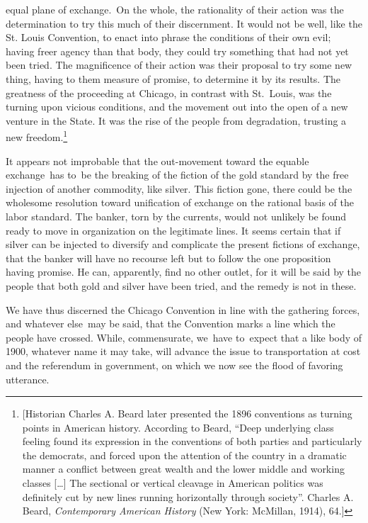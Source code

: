 \documentclass[twoside,symmetric,nobib,justified]{tufte-book}
\begin{document}
equal plane of exchange.~On the whole, the rationality of their action
was the determination to try this much of their discernment. It would
not be well, like the St. Louis Convention, to enact into phrase the
conditions of their own evil; having freer agency than that body, they
could try something that had not yet been tried. The magnificence of
their action was their proposal to try some new thing, having to them
measure of promise, to determine it by its results. The greatness of the
proceeding at Chicago, in contrast with St.~Louis, was the turning upon
vicious conditions, and the movement out into the open of a new venture
in the State. It was the rise of the people from degradation, trusting a
new freedom.\footnote{{[}Historian Charles A. Beard later presented the
  1896 conventions as turning points in American history. According to
  Beard, ``Deep underlying class feeling found its expression in the
  conventions of both parties and particularly the democrats, and forced
  upon the attention of the country in a dramatic manner a conflict
  between great wealth and the lower middle and working classes
  {[}\ldots{]} The sectional or vertical cleavage in American politics
  was definitely cut by new lines running horizontally through
  society''. Charles A. Beard, \emph{Contemporary American History} (New
  York: McMillan, 1914), 64.{]}}~

It appears not improbable that the out-movement toward the equable
exchange~has to~be the breaking of the fiction of the gold standard by
the free injection of another commodity, like silver. This fiction gone,
there could be the wholesome resolution toward unification of exchange
on the rational basis of the labor standard. The banker, torn by the
currents, would not unlikely be found ready to move in organization on
the legitimate lines. It seems certain that if silver can be injected to
diversify and complicate the present fictions of exchange, that the
banker will have no recourse left but to follow the one proposition
having promise. He can, apparently, find no other outlet, for it will be
said by the people that both gold and silver have been tried, and the
remedy is not in these.~

We have thus discerned the Chicago Convention in line with the gathering
forces, and whatever else~may be said, that the Convention marks a line
which the people have crossed. While, commensurate, we~have to~expect
that a like body of 1900, whatever name it may take, will advance the
issue to transportation at cost and the referendum in government, on
which we now see the flood of favoring utterance.~
\end{document}
